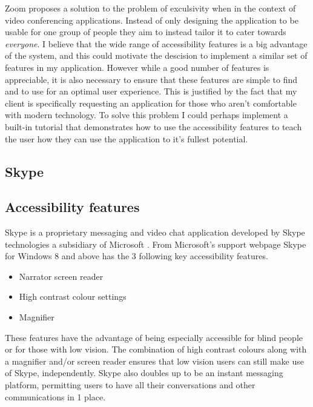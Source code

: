 \vspace{0.2cm}

Zoom proposes a solution to the problem of exculsivity when in 
the context of video conferencing applications. Instead of only
designing the application to be usable for one group of people
they aim to instead tailor it to cater towards 
\textit{everyone}. I believe that the wide range of
accessibility features is a big advantage of the system, and 
this could motivate the descision to implement a similar set
of features in my application. However while a good number of 
features is appreciable, it is also necessary to ensure that 
these features are simple to find and to use for an optimal 
user experience. This is justified by the fact that my client
is specifically requesting an application for those who aren't
comfortable with modern technology. To solve this problem I 
could perhaps implement a built-in tutorial that demonstrates 
how to use the accessibility features to teach the user how 
they can use the application to it's fullest potential.

\subsection{Skype}

\subsection*{Accessibility features}

Skype is a proprietary messaging and video chat application
developed by Skype technologies a subsidiary of Microsoft 
\cite{skype}. From Microsoft's support webpage Skype for 
Windows 8 and above has the 3 following key accessibility 
features.

\begin{itemize}
  \item Narrator screen reader
  \item High contrast colour settings
  \item Magnifier
\end{itemize}

These features have the advantage of being especially 
accessible for blind people or for those with low vision. The 
combination of high contrast colours along with a magnifier 
and/or screen reader ensures that low vision users can still 
make use of Skype, independently. Skype also doubles up to be
an instant messaging platform, permitting users to have all 
their conversations and other communications in 1 place.

